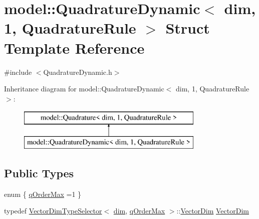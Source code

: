 \hypertarget{structmodel_1_1_quadrature_dynamic_3_01dim_00_011_00_01_quadrature_rule_01_4}{}\section{model\+:\+:Quadrature\+Dynamic$<$ dim, 1, Quadrature\+Rule $>$ Struct Template Reference}
\label{structmodel_1_1_quadrature_dynamic_3_01dim_00_011_00_01_quadrature_rule_01_4}


{\ttfamily \#include $<$Quadrature\+Dynamic.\+h$>$}

Inheritance diagram for model\+:\+:Quadrature\+Dynamic$<$ dim, 1, Quadrature\+Rule $>$\+:\begin{figure}[H]
\begin{center}
\leavevmode
\includegraphics[height=2.000000cm]{structmodel_1_1_quadrature_dynamic_3_01dim_00_011_00_01_quadrature_rule_01_4}
\end{center}
\end{figure}
\subsection*{Public Types}
\begin{DoxyCompactItemize}
\item 
enum \{ \hyperlink{structmodel_1_1_quadrature_dynamic_3_01dim_00_011_00_01_quadrature_rule_01_4_a28357d85137133761eefc7f06b6e7117ab0a5313cd23ea4952db4c8843dc43ab0}{q\+Order\+Max} =1
 \}
\item 
typedef \hyperlink{structmodel_1_1_vector_dim_type_selector}{Vector\+Dim\+Type\+Selector}$<$ \hyperlink{plot_nd_a_8m_a382f3ca768b275b8d563604f7fc7df73}{dim}, \hyperlink{structmodel_1_1_quadrature_dynamic_3_01dim_00_011_00_01_quadrature_rule_01_4_a28357d85137133761eefc7f06b6e7117ab0a5313cd23ea4952db4c8843dc43ab0}{q\+Order\+Max} $>$\+::\hyperlink{structmodel_1_1_quadrature_dynamic_3_01dim_00_011_00_01_quadrature_rule_01_4_a3efc5051d8d4eeceef8619ddd379ec2f}{Vector\+Dim} \hyperlink{structmodel_1_1_quadrature_dynamic_3_01dim_00_011_00_01_quadrature_rule_01_4_a3efc5051d8d4eeceef8619ddd379ec2f}{Vector\+Dim}
\end{DoxyCompactItemize}

